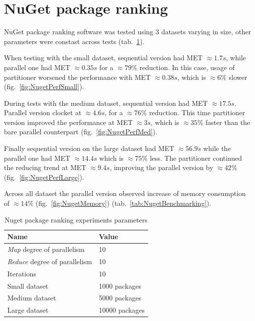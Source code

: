 \label{sec: NuGet}
\section{NuGet package ranking}
NuGet package ranking software was tested using 3 datasets varying in size, other parameters were constast across tests (tab.~\ref{tab:NuGetParameters}). 

When testing with the small dataset, sequential version had MET $\approx 1.7s$, while parallel one had MET $\approx 0.35s$ for a $\approx 79\%$ reduction. 
In this case, usage of partitioner worsened the performance with MET  $\approx 0.38s$, which is $\approx 6\%$ slower (fig.~\ref{fig:NugetPerfSmall}). 

During tests with the medium dataset, sequential version had MET $\approx 17.5 s$. Parallel version clocket at $\approx 4.6s$, for a $\approx 76\%$ 
reduction. This time partitioner version improved the performance at MET $ \approx 3s$, which is $\approx 35\%$ faster than the bare parallel 
counterpart (fig.~\ref{fig:NugetPerfMed}). 

Finally sequential version on the large dataset had MET $\approx 56.9s$ while the parallel one had MET $\approx 14.4s$ which is $\approx 75\%$ less.
The partitioner continued the reducing trend at MET $\approx 9.4s$, improving the parallel version by $\approx 42 \%$ (fig.~\ref{fig:NugetPerfLarge}). 

Across all dataset the parallel version observed increase of memory consumption of $\approx 14\%$ (fig.~\ref{fig:NugetMemory}) (tab.~\ref{tab:NugetBenchmarking}).
\begin{table}[!ht]
    \centering
    \caption{Nuget package ranking experiments parameters}
		\label{tab:NuGetParameters}
    \begin{tabular}{p{5cm}p{3cm}}
			\toprule
			\bfseries Name 	&
			\bfseries Value \\
			\midrule
			\emph{Map} degree of parallelism & 10 \\
			\emph{Reduce} degree of parallelism & 10 \\
			Iterations & 10 \\ 
			Small dataset  & 1000 packages  \\	
			Medium dataset  & 5000 packages  \\	
			Large dataset  & 10000 packages  \\	
			\bottomrule
    \end{tabular}
\end{table}

